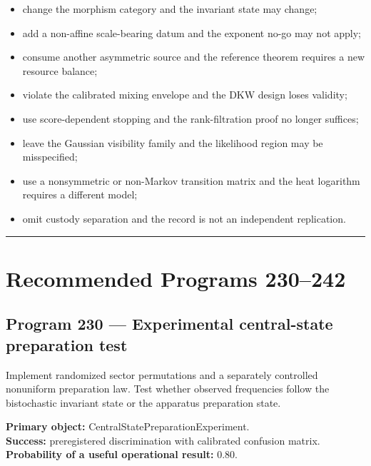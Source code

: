 \documentclass[11pt,a4paper,openany]{report}
\begin{document}
\begin{itemize}
\item 
change the morphism category and the invariant state may change;

\item 
add a non-affine scale-bearing datum and the exponent no-go may not apply;

\item 
consume another asymmetric source and the reference theorem requires a new resource balance;

\item 
violate the calibrated mixing envelope and the DKW design loses validity;

\item 
use score-dependent stopping and the rank-filtration proof no longer suffices;

\item 
leave the Gaussian visibility family and the likelihood region may be misspecified;

\item 
use a nonsymmetric or non-Markov transition matrix and the heat logarithm requires a different model;

\item 
omit custody separation and the record is not an independent replication.

\end{itemize}

\par\medskip\hrule\medskip

\chapter{Recommended Programs 230--242}

\section{Program 230 --- Experimental central-state preparation test}

Implement randomized sector permutations and a separately controlled nonuniform preparation law. Test whether observed frequencies follow the bistochastic invariant state or the apparatus preparation state.

\textbf{Primary object:} CentralStatePreparationExperiment.\\
\textbf{Success:} preregistered discrimination with calibrated confusion matrix.\\
\textbf{Probability of a useful operational result:} \(0.80\).
\end{document}
